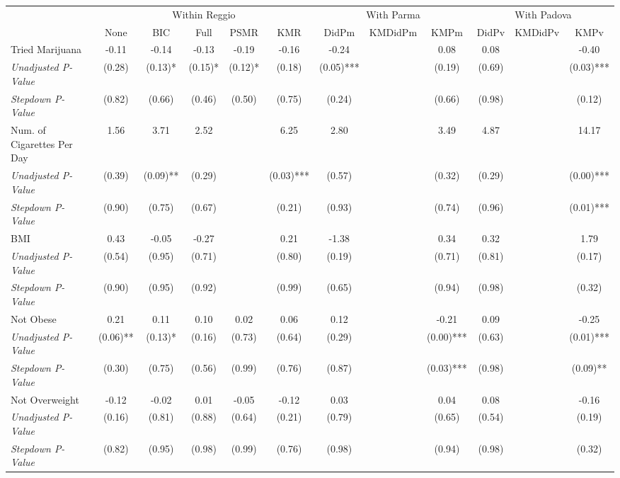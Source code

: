 \begin{tabular}{l c c c c c c c c c c c}
\toprule
& \multicolumn{5}{c}{Within Reggio} & \multicolumn{3}{c}{With Parma} & \multicolumn{3}{c}{With Padova} \\\cmidrule(lr){2-6} \cmidrule(lr){7-9} \cmidrule(lr){10-12}
 & None & BIC & Full & PSMR & KMR & DidPm & KMDidPm & KMPm & DidPv & KMDidPv & KMPv \\
\midrule
Tried Marijuana & -0.11 & -0.14 & -0.13 & -0.19 & -0.16 & -0.24 & & 0.08 & 0.08 & & -0.40 \\
\quad \textit{Unadjusted P-Value} & (0.28) & (0.13)* & (0.15)* & (0.12)* & (0.18) & (0.05)*** & & (0.19) & (0.69) & & (0.03)*** \\
\quad \textit{Stepdown P-Value} & (0.82) & (0.66) & (0.46) & (0.50) & (0.75) & (0.24) & & (0.66) & (0.98) & & (0.12) \\
Num. of Cigarettes Per Day & 1.56 & 3.71 & 2.52 & & 6.25 & 2.80 & & 3.49 & 4.87 & & 14.17 \\
\quad \textit{Unadjusted P-Value} & (0.39) & (0.09)** & (0.29) & & (0.03)*** & (0.57) & & (0.32) & (0.29) & & (0.00)*** \\
\quad \textit{Stepdown P-Value} & (0.90) & (0.75) & (0.67) & & (0.21) & (0.93) & & (0.74) & (0.96) & & (0.01)*** \\
BMI & 0.43 & -0.05 & -0.27 & & 0.21 & -1.38 & & 0.34 & 0.32 & & 1.79 \\
\quad \textit{Unadjusted P-Value} & (0.54) & (0.95) & (0.71) & & (0.80) & (0.19) & & (0.71) & (0.81) & & (0.17) \\
\quad \textit{Stepdown P-Value} & (0.90) & (0.95) & (0.92) & & (0.99) & (0.65) & & (0.94) & (0.98) & & (0.32) \\
Not Obese & 0.21 & 0.11 & 0.10 & 0.02 & 0.06 & 0.12 & & -0.21 & 0.09 & & -0.25 \\
\quad \textit{Unadjusted P-Value} & (0.06)** & (0.13)* & (0.16) & (0.73) & (0.64) & (0.29) & & (0.00)*** & (0.63) & & (0.01)*** \\
\quad \textit{Stepdown P-Value} & (0.30) & (0.75) & (0.56) & (0.99) & (0.76) & (0.87) & & (0.03)*** & (0.98) & & (0.09)** \\
Not Overweight & -0.12 & -0.02 & 0.01 & -0.05 & -0.12 & 0.03 & & 0.04 & 0.08 & & -0.16 \\
\quad \textit{Unadjusted P-Value} & (0.16) & (0.81) & (0.88) & (0.64) & (0.21) & (0.79) & & (0.65) & (0.54) & & (0.19) \\
\quad \textit{Stepdown P-Value} & (0.82) & (0.95) & (0.98) & (0.99) & (0.76) & (0.98) & & (0.94) & (0.98) & & (0.32) \\

\end{tabular}
